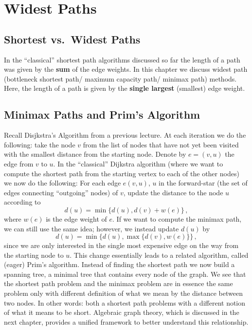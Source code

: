 \chapter{Widest Paths}%
\label{chap:08}

\setcounter{section}{1}
\section{Shortest vs.\ Widest Paths}
In the ``classical'' shortest path algorithms discussed so far the length of a
path was given by the \textbf{sum} of the edge weights. In this chapter we
discuss widest path (bottleneck shortest path/ maximum capacity path/ minimax
path) methods.  Here, the length of a path is given by the \textbf{single
  largest} (smallest) edge weight.  

\section{Minimax Paths and Prim's Algorithm}
Recall Disjkstra's Algorithm from a previous lecture. At each iteration we do
the following: take the node $v$ from the list of nodes that have not yet been
visited with the smallest distance from the starting node. Denote by $e = (v,u)$
the edge from $v$ to $u$.  In the ``classical'' Dijkstra algorithm (where we
want to compute the shortest path from the starting vertex to each of the other
nodes) we now do the following: For each edge $e(v,u)$, $u$ in the forward-star
(\ie the set of edges connecting ``outgoing'' nodes) of $v$, update the distance
to the node $u$ according to
\begin{equation*}
  d(u) = \min\{d(u), d(v) + w(e) \}\,,
\end{equation*}
where $w(e)$ is the edge weight of $e$. If we want to compute the minimax path,
we can still use the same idea; however, we instead update $d(u)$ by
\begin{equation*}
  d(u) = \min\{d(u), \max\{ d(v), w(e) \}\}\,,
\end{equation*}
since we are only interested in the single most expensive edge on the way from
the starting node to $u$. This change essentially leads to a related algorithm,
called (eager) Prim's algorithm. Instead of finding the shortest path we now
build a spanning tree, \ie a minimal tree that contains every node of the
graph. We see that the shortest path problem and the minimax problem are in
essence the same problem only with different definition of what we mean by the
distance between two nodes. In other words: both a shortest path problems with a
different notion of what it means to be short. Algebraic graph theory, which is
discussed in the next chapter, provides a unified framework to better understand
this relationship.

